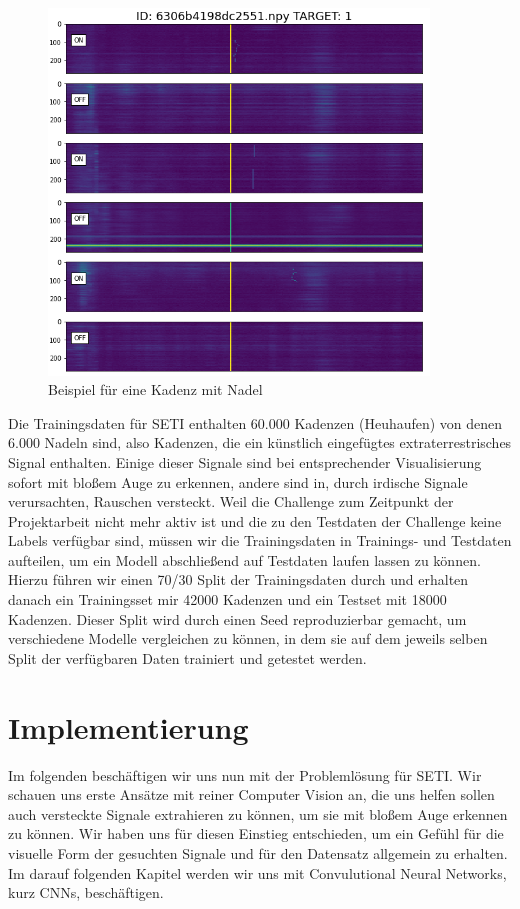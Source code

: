 \documentclass[12pt, a4paper]{article}
\begin{document}
\begin{figure}[t]
	\centering
	\includegraphics[width=0.9\textwidth]{"img/kadenz_pos_1.png"}
	\caption{Beispiel für eine Kadenz mit Nadel}
\label{fig:kadenz_pos_1}
\end{figure}

Die Trainingsdaten für SETI enthalten 60.000 Kadenzen (Heuhaufen) von denen 6.000 Nadeln sind, also Kadenzen, die ein künstlich eingefügtes extraterrestrisches Signal enthalten. Einige dieser Signale sind bei entsprechender Visualisierung sofort mit bloßem Auge zu erkennen, andere sind in, durch irdische Signale verursachten, Rauschen versteckt. Weil die Challenge zum Zeitpunkt der Projektarbeit nicht mehr aktiv ist und die zu den Testdaten der Challenge keine Labels verfügbar sind, müssen wir die Trainingsdaten in Trainings- und Testdaten aufteilen, um ein Modell abschließend auf Testdaten laufen lassen zu können. Hierzu führen wir einen 70/30 Split der Trainingsdaten durch und erhalten danach ein Trainingsset mir 42000 Kadenzen und ein Testset mit 18000 Kadenzen. Dieser Split wird durch einen Seed reproduzierbar gemacht, um verschiedene Modelle vergleichen zu können, in dem sie auf dem jeweils selben Split der verfügbaren Daten trainiert und getestet werden.


\section{Implementierung}
Im folgenden beschäftigen wir uns nun mit der Problemlösung für SETI. Wir schauen uns erste Ansätze mit reiner Computer Vision an, die uns helfen sollen auch versteckte Signale extrahieren zu können, um sie mit bloßem Auge erkennen zu können. Wir haben uns für diesen Einstieg entschieden, um ein Gefühl für die visuelle Form der gesuchten Signale und für den Datensatz allgemein zu erhalten. Im darauf folgenden Kapitel werden wir uns mit Convulutional Neural Networks, kurz CNNs, beschäftigen.
\end{document}

